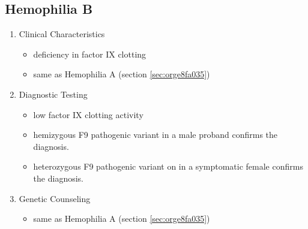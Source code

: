 \documentclass{scrartcl}
\begin{document}
\subsection{Hemophilia B}
\label{sec:orgc258c21}
\begin{enumerate}
\item Clinical Characteristics
\label{sec:org0bebe4d}
\begin{itemize}
\item deficiency in factor IX clotting
\item same as Hemophilia A (section \ref{sec:orge8fa035})
\end{itemize}
\item Diagnostic Testing
\label{sec:orgf745c8b}
\begin{itemize}
\item low factor IX clotting activity
\item hemizygous F9 pathogenic variant in a male proband confirms the
diagnosis.
\item heterozygous F9 pathogenic variant on in a symptomatic female
confirms the diagnosis.
\end{itemize}
\item Genetic Counseling
\label{sec:org4720845}
\begin{itemize}
\item same as Hemophilia A (section \ref{sec:orge8fa035})
\end{itemize}
\end{enumerate}
\end{document}
